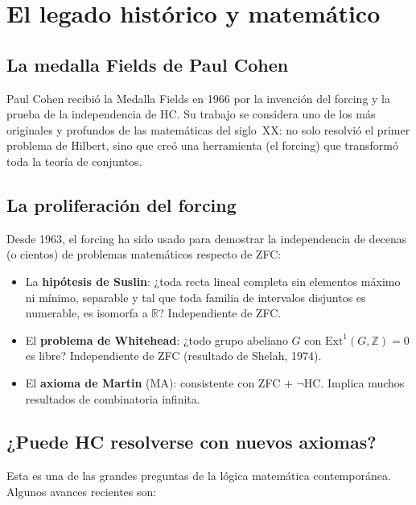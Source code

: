 \section{El legado histórico y matemático}

\subsection{La medalla Fields de Paul Cohen}

Paul Cohen recibió la Medalla Fields en 1966 por la invención del forcing y la prueba de la independencia de HC. Su trabajo se considera uno de los más originales y profundos de las matemáticas del siglo~XX: no solo resolvió el primer problema de Hilbert, sino que creó una herramienta (el forcing) que transformó toda la teoría de conjuntos.

\subsection{La proliferación del forcing}

Desde 1963, el forcing ha sido usado para demostrar la independencia de decenas (o cientos) de problemas matemáticos respecto de ZFC:
\begin{itemize}[leftmargin=2em]
  \item La \textbf{hipótesis de Suslin}: ¿toda recta lineal completa sin elementos máximo ni mínimo, separable y tal que toda familia de intervalos disjuntos es numerable, es isomorfa a $\mathbb{R}$? Independiente de ZFC.
  \item El \textbf{problema de Whitehead}: ¿todo grupo abeliano $G$ con $\mathrm{Ext}^1(G, \mathbb{Z}) = 0$ es libre? Independiente de ZFC (resultado de Shelah, 1974).
  \item El \textbf{axioma de Martin} ($\mathrm{MA}$): consistente con ZFC $+$ $\neg$HC. Implica muchos resultados de combinatoria infinita.
\end{itemize}

\subsection{¿Puede HC resolverse con nuevos axiomas?}

Esta es una de las grandes preguntas de la lógica matemática contemporánea. Algunos avances recientes son:

